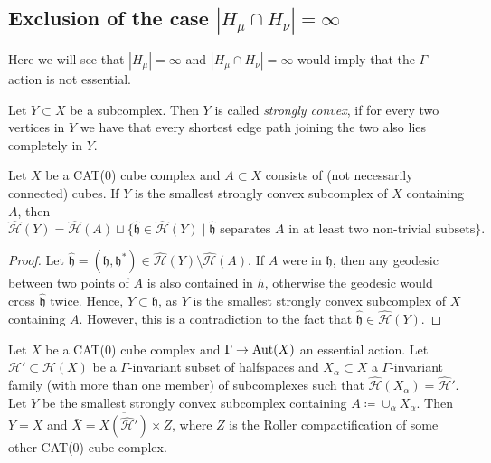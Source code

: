 \subsection{Exclusion of the case \(|H_\mu \cap H_\nu| = \infty\)}
\label{sec:M=infty}

Here we will see that \(|H_\mu| = \infty\) and \(|H_\mu \cap H_\nu| = \infty\) would imply that the \(\Gamma\)-action is not essential.

\begin{defin}
  Let \(Y \subset X\) be a subcomplex. Then \(Y\) is called \emph{strongly convex}, if for every two vertices in \(Y\) we have that every shortest edge path joining the two also lies completely in \(Y\).
\end{defin}

\begin{lemma}[{\cite[Lemma~4.16]{MR3509968}}]
  \label{lem:4.16}
  Let \(X\) be a CAT(0) cube complex and \(A \subset X\) consists of (not necessarily connected) cubes. If \(Y\) is the smallest strongly convex subcomplex of \(X\) containing \(A\), then
  \[
    \mathcal{\hat H}(Y) = \mathcal{\hat H}(A) \sqcup \{\mathfrak{\hat h} \in \mathcal{\hat H}(Y) \mid \mathfrak{\hat h} \text{ separates } A \text{ in at least two non-trivial subsets}\}.
  \]
\end{lemma}

\begin{proof}
  Let \(\mathfrak{\hat h} = (\mathfrak{h}, \mathfrak{h}^\ast) \in \mathcal{\hat H}(Y) \setminus \mathcal{\hat H}(A)\). If \(A\) were in \(\mathfrak{h}\), then any geodesic between two points of \(A\) is also contained in \(h\), otherwise the geodesic would cross \(\mathfrak{\hat h}\) twice. Hence, \(Y \subset \mathfrak{h}\), as \(Y\) is the smallest strongly convex subcomplex of \(X\) containing \(A\). However, this is a contradiction to the fact that \(\mathfrak{\hat h} \in \mathcal{\hat H}(Y)\).
\end{proof}

\begin{prop}[{\cite[Proposition~4.17]{MR3509968}}]
  \label{prop:4.17}
  Let \(X\) be a CAT(0) cube complex and \(\Gamma \to \operatorname{Aut}(X)\) an essential action. Let \(\mathcal{H}' \subset \mathcal{H}(X)\) be a \(\Gamma\)-invariant subset of halfspaces and \(X_\alpha \subset X\) a \(\Gamma\)-invariant family (with more than one member) of subcomplexes such that \(\mathcal{\hat H}(X_\alpha) = \mathcal{\hat H}'\). Let \(Y\) be the smallest strongly convex subcomplex containing \(A \coloneqq \cup_\alpha X_\alpha\). Then \(Y = X\) and \(\bar X = \overline{X(\mathcal{\hat H}')} \times Z\), where \(Z\) is the Roller compactification of some other CAT(0) cube complex.
\end{prop}

